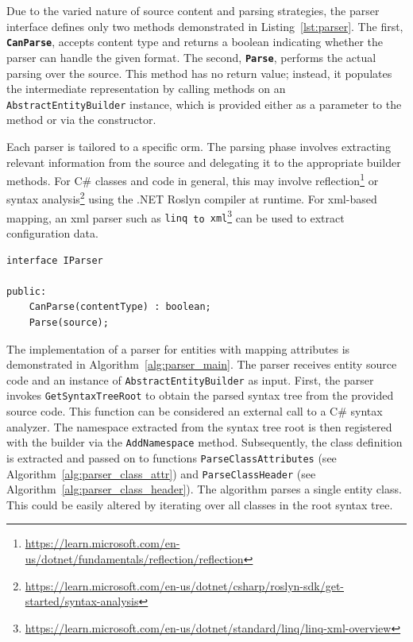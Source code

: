 Due to the varied nature of source content and parsing strategies, the parser interface defines only two methods demonstrated in Listing~\ref{lst:parser}. The first, \texttt{\textbf{CanParse}}, accepts content type and returns a boolean indicating whether the parser can handle the given format. The second, \texttt{\textbf{Parse}}, performs the actual parsing over the source. This method has no return value; instead, it populates the intermediate representation by calling methods on an \texttt{AbstractEntityBuilder} instance, which is provided either as a parameter to the method or via the constructor.

Each parser is tailored to a specific \acrshort{orm}. The parsing phase involves extracting relevant information from the source and delegating it to the appropriate builder methods. For C\# classes and code in general, this may involve  reflection\footnote{\url{https://learn.microsoft.com/en-us/dotnet/fundamentals/reflection/reflection}} or syntax analysis\footnote{\url{https://learn.microsoft.com/en-us/dotnet/csharp/roslyn-sdk/get-started/syntax-analysis}} using the .NET Roslyn compiler at runtime. For \acrshort{xml}-based mapping, an \acrshort{xml} parser such as \texttt{\acrshort{linq} to \acrshort{xml}}\footnote{\url{https://learn.microsoft.com/en-us/dotnet/standard/linq/linq-xml-overview}} can be used to extract configuration data.

 \begin{lstlisting}[caption={IParser interface structure}, language=pseudo, label={lst:parser}]
interface IParser

public:
    CanParse(contentType) : boolean;
    Parse(source);
 \end{lstlisting}

The implementation of a parser for entities with mapping attributes is demonstrated in Algorithm~\ref{alg:parser_main}. The parser receives entity source code and an instance of \texttt{AbstractEntityBuilder} as input. First, the parser invokes \texttt{GetSyntaxTreeRoot} to obtain the parsed syntax tree from the provided source code. This function can be considered an external call to a C\# syntax analyzer. The namespace extracted from the syntax tree root is then registered with the builder via the \texttt{AddNamespace} method. Subsequently, the class definition is extracted and passed on to functions \texttt{ParseClassAttributes} (see Algorithm~\ref{alg:parser_class_attr}) and \texttt{ParseClassHeader} (see Algorithm~\ref{alg:parser_class_header}). The algorithm parses a single entity class. This could be easily altered by iterating over all classes in the root syntax tree.

